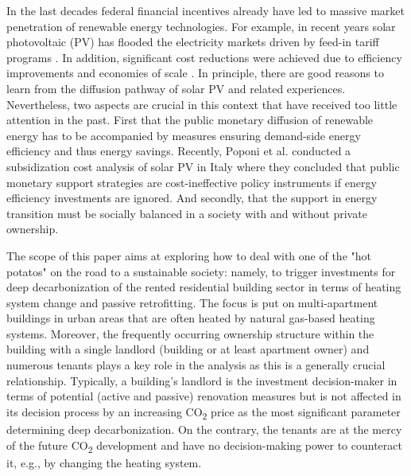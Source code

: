 In the last decades federal financial incentives already have led to massive market penetration of renewable energy technologies. For example, in recent years solar photovoltaic (PV) has flooded the electricity markets driven by feed-in tariff programs \cite{hoppmann2014compulsive}. In addition, significant cost reductions were achieved due to efficiency improvements and economies of scale \cite{haas2011historical}. In principle, there are good reasons to learn from the diffusion pathway of solar PV and related experiences. Nevertheless, two aspects are crucial in this context that have received too little attention in the past. First that the public monetary diffusion of renewable energy has to be accompanied by measures ensuring demand-side energy efficiency and thus energy savings. Recently, Poponi et al. \cite{poponi2021subsidisation} conducted a subsidization cost analysis of solar PV in Italy where they concluded that public monetary support strategies are cost-ineffective policy instruments if energy efficiency investments are ignored. And secondly, that the support in energy transition must be socially balanced in a society with and without private ownership.\vspace{0.5cm}

The scope of this paper aims at exploring how to deal with one of the "hot potatos" on the road to a sustainable society: namely, to trigger investments for deep decarbonization of the rented residential building sector in terms of heating system change and passive retrofitting. The focus is put on multi-apartment buildings in urban areas that are often heated by natural gas-based heating systems. Moreover, the frequently occurring ownership structure within the building with a single landlord (building or at least apartment owner) and numerous tenants plays a key role in the analysis as this is a generally crucial relationship. Typically, a building's landlord is the investment decision-maker in terms of potential (active and passive) renovation measures but is not affected in its decision process by an increasing CO\textsubscript{2} price as the most significant parameter determining deep decarbonization. On the contrary, the tenants are at the mercy of the future CO\textsubscript{2} development and have no decision-making power to counteract it, e.g., by changing the heating system.\vspace{0.5cm}

